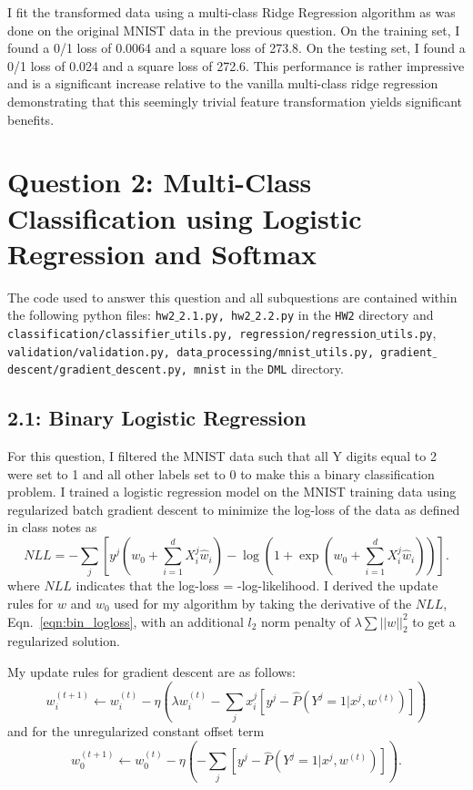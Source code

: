 \documentclass[12pt]{amsart}
\begin{document}
I fit the transformed data using a multi-class Ridge Regression algorithm as was done on the original MNIST data in the previous question.  On the training set, I found a 0/1 loss of 0.0064 and a square loss of 273.8.  On the testing set, I found a 0/1 loss of 0.024 and a square loss of 272.6.  This performance is rather impressive and is a significant increase relative to the vanilla multi-class ridge regression demonstrating that this seemingly trivial feature transformation yields significant benefits.  

\section*{Question 2: Multi-Class Classification using Logistic Regression and Softmax}

The code used to answer this question and all subquestions are contained within the following python files: {\tt hw2$\_$2.1.py, hw2$\_$2.2.py} in the {\tt HW2} directory and {\tt classification/classifier$\_$utils.py, regression/regression$\_$utils.py},
 {\tt validation/validation.py, data$\_$processing/mnist$\_$utils.py, gradient$\_$descent/gradient$\_$descent.py, mnist} in the {\tt DML} directory.

\subsection*{2.1: Binary Logistic Regression}

For this question, I filtered the MNIST data such that all Y digits equal to 2 were set to 1 and all other labels set to 0 to make this a binary classification problem.  I trained a logistic regression model on the MNIST training data using regularized batch gradient descent to minimize the log-loss of the data as defined in class notes as
\begin{equation} \label{eqn:bin_logloss}
NLL = -\sum_j [y^j (w_0 + \sum_{i=1}^d X_i^j \hat{w}_i) - \log(1+ \exp(w_0 + \sum_{i=1}^d X_i^j \hat{w}_i))].
\end{equation}
where $NLL$ indicates that the log-loss = -log-likelihood.  I derived the update rules for $w$ and $w_0$ used for my algorithm by taking the derivative of the $NLL$, Eqn.~\ref{eqn:bin_logloss}, with an additional $l_2$ norm penalty of $\lambda \sum||w||^2_2$ to get a regularized solution.  

My update rules for gradient descent are as follows:
\begin{equation} \label{eqn:bin_w_update}
w^{(t+1)}_i \leftarrow w^{(t)}_i - \eta (\lambda w^{(t)}_i - \sum_j x^j_i[y^j - \hat{P}(Y^j = 1 | x^j, w^{(t)})])
\end{equation}
and for the unregularized constant offset term
\begin{equation} \label{eqn:bin_w0_update}
w^{(t+1)}_0 \leftarrow w^{(t)}_0 - \eta (- \sum_j[y^j - \hat{P}(Y^j = 1 | x^j, w^{(t)})]).
\end{equation}
\end{document}
